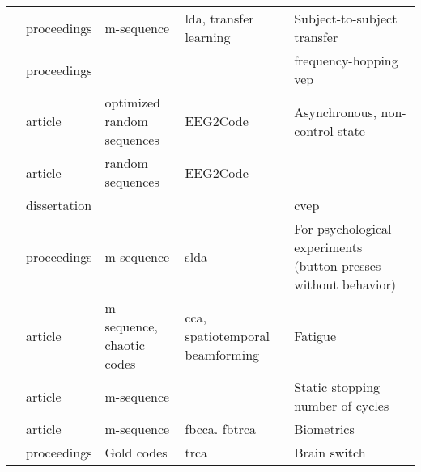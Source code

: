 \documentclass[a4paper,landscape]{article}
\begin{document}
\begin{table}[H]
\begin{tabular}{p{5cm}p{2cm}p{5cm}p{5cm}p{6.5cm}}
		\citeauthor{luo2019} & proceedings & m-sequence & \acrshort{lda}, transfer learning & Subject-to-subject transfer \\
		\citeauthor{matsuno2019} & proceedings & & & frequency-hopping \acrshort{vep} \\
		\citeauthor{nagel2019a} & article & optimized random sequences & EEG2Code & Asynchronous, non-control state \\
		\citeauthor{nagel2019b} & article & random sequences & EEG2Code & \\
		\citeauthor{nagel2019c} & dissertation & & & \acrshort{cvep} \\
		\citeauthor{peng2019} & proceedings & m-sequence & \acrshort{slda} & For psychological experiments (button presses without behavior) \\
		\citeauthor{shirzhiyan2019} & article & m-sequence, chaotic codes & \acrshort{cca}, spatiotemporal beamforming & Fatigue \\
		\citeauthor{turi2019} & article & m-sequence & & Static stopping number of cycles \\
		\citeauthor{zhao2019} & article & m-sequence & \acrshort{fbcca}. \acrshort{fbtrca} & Biometrics \\
		\citeauthor{zheng2019} & proceedings & Gold codes & \acrshort{trca} & Brain switch \\
		\bottomrule
	\end{tabular}
\end{table}
\end{document}
